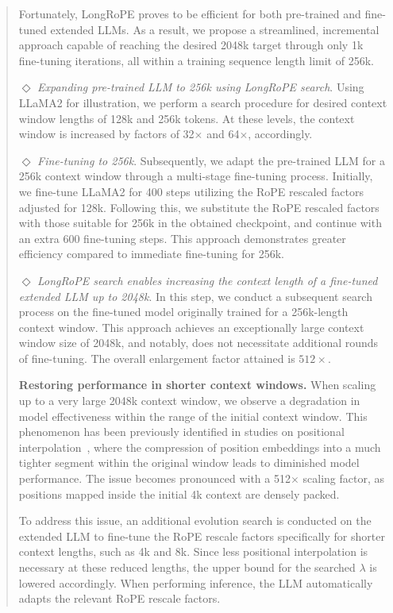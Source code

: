 \begin{abstract}
Fortunately, LongRoPE proves to be efficient for both pre-trained and fine-tuned extended LLMs. As a result, we propose a streamlined, incremental approach capable of reaching the desired 2048k target through only 1k fine-tuning iterations, all within a training sequence length limit of 256k.

$\Diamond$ \textit{Expanding pre-trained LLM to 256k using LongRoPE search}. Using LLaMA2 for illustration, we perform a search procedure for desired context window lengths of 128k and 256k tokens. At these levels, the context window is increased by factors of 32$\times$ and 64$\times$, accordingly.

$\Diamond$ \textit{Fine-tuning to 256k}. Subsequently, we adapt the pre-trained LLM for a 256k context window through a multi-stage fine-tuning process. Initially, we fine-tune LLaMA2 for 400 steps utilizing the RoPE rescaled factors adjusted for 128k. Following this, we substitute the RoPE rescaled factors with those suitable for 256k in the obtained checkpoint, and continue with an extra 600 fine-tuning steps. This approach demonstrates greater efficiency compared to immediate fine-tuning for 256k.

$\Diamond$ \textit{LongRoPE search enables increasing the context length of a fine-tuned extended LLM up to 2048k}. In this step, we conduct a subsequent search process on the fine-tuned model originally trained for a 256k-length context window. This approach achieves an exceptionally large context window size of 2048k, and notably, does not necessitate additional rounds of fine-tuning. The overall enlargement factor attained is $512\times$.

\textbf{Restoring performance in shorter context windows.} When scaling up to a very large 2048k context window, we observe a degradation in model effectiveness within the range of the initial context window. This phenomenon has been previously identified in studies on positional interpolation~\cite{pi}, where the compression of position embeddings into a much tighter segment within the original window leads to diminished model performance. The issue becomes pronounced with a 512$\times$ scaling factor, as positions mapped inside the initial 4k context are densely packed.

To address this issue, an additional evolution search is conducted on the extended LLM to fine-tune the RoPE rescale factors specifically for shorter context lengths, such as 4k and 8k. Since less positional interpolation is necessary at these reduced lengths, the upper bound for the searched $\lambda$ is lowered accordingly. When performing inference, the LLM automatically adapts the relevant RoPE rescale factors.


\end{abstract}
